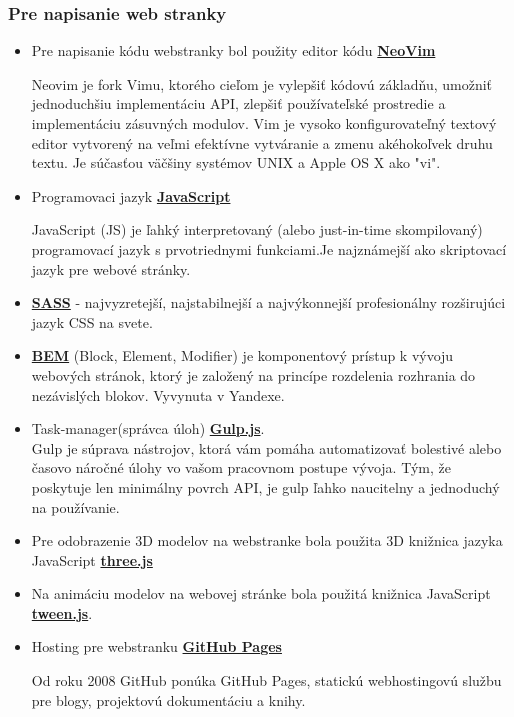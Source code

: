       \subsubsection{Pre napisanie web stranky}
        \begin{itemize}
          \item{
            Pre napisanie kódu webstranky bol použity editor kódu \textbf{\href{https://neovim.io/}{NeoVim}}

            Neovim je fork Vimu, ktorého cieľom je vylepšiť kódovú základňu, umožniť jednoduchšiu implementáciu API, zlepšiť používateľské prostredie a implementáciu zásuvných modulov.
            Vim je vysoko konfigurovateľný textový editor vytvorený na veľmi efektívne vytváranie a zmenu akéhokoľvek druhu textu. Je súčasťou väčšiny systémov UNIX a Apple OS X ako "vi".
          }
          \item{
            Programovaci jazyk \textbf{\href{https://developer.mozilla.org/en-US/docs/Web/JavaScript}{JavaScript}}

            JavaScript (JS) je ľahký interpretovaný (alebo just-in-time skompilovaný) programovací jazyk s prvotriednymi funkciami.Je najznámejší ako skriptovací jazyk pre webové stránky.
          }
          \item{
            \textbf{\href{https://sass-lang.com/}{SASS}} - najvyzretejší, najstabilnejší a najvýkonnejší profesionálny rozširujúci jazyk CSS na svete.
          }
          \item{
            \textbf{\href{https://yandex.ru/dev/bem/}{BEM}} (Block, Element, Modifier) je komponentový prístup k vývoju webových stránok, ktorý je založený na princípe rozdelenia rozhrania do nezávislých blokov. Vyvynuta v Yandexe.
          }
          \item{
            Task-manager(správca úloh) \textbf{\href{https://gulpjs.com/}{Gulp.js}}. \\
            Gulp je súprava nástrojov, ktorá vám pomáha automatizovať bolestivé alebo časovo náročné úlohy vo vašom pracovnom postupe vývoja. Tým, že poskytuje len minimálny povrch API, je gulp ľahko naucitelny a jednoduchý na používanie.
          }
          \item{
            Pre odobrazenie 3D modelov na webstranke bola použita 3D knižnica jazyka JavaScript \textbf{\href{https://github.com/mrdoob/three.js/}{three.js}}
          }
          \item{
            Na animáciu modelov na webovej stránke bola použitá knižnica JavaScript \textbf{\href{https://tweenjs.github.io/tween.js/}{tween.js}}.
          }
          \item{
            Hosting pre webstranku \textbf{\href{https://pages.github.com/}{GitHub Pages}} 

            Od roku 2008 GitHub ponúka GitHub Pages, statickú webhostingovú službu pre blogy, projektovú dokumentáciu a knihy.
          }
        \end{itemize}

